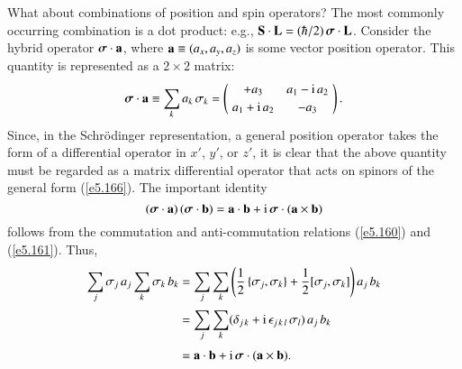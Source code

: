 What about combinations of position and spin operators? The most
commonly occurring combination  is a dot product: {\rm e.g.}, 
${\bf S}\cdot {\bf L} = (\hbar/2)\,\mbox{\boldmath$\sigma$} \cdot {\bf L}$. 
Consider the hybrid
operator  $\mbox{\boldmath$\sigma$} \cdot {\bf a}$, where ${\bf a} \equiv (a_x, a_y, a_z)$ is
some  vector position  operator. This quantity is represented as 
a $2\times 2$ matrix:
\begin{equation}\label{e5.173}
\mbox{\boldmath$\sigma$} \cdot {\bf a} \equiv \sum_k a_k \,\sigma_k = 
\left(\!\begin{array}{cc} +a_3 & a_1 -{\rm i}\,a_2\\[0.5ex]
a_1 + {\rm i}\,a_2 & -a_3 \end{array}\!\right).
\end{equation}
Since, in the Schr\"{o}dinger representation, a general position operator takes
the form of a differential operator in $x'$, $y'$, or $z'$, it is clear that
the above quantity must be regarded as a matrix differential operator that 
acts on spinors of the general form (\ref{e5.166}).
The important identity
\begin{equation}\label{e5.174}
(\mbox{\boldmath$\sigma$} \cdot {\bf a} ) \,(\mbox{\boldmath$\sigma$} \cdot {\bf b}) = {\bf a} \cdot {\bf b}
+{\rm i}\,\mbox{\boldmath$\sigma$}\cdot ({\bf a} \times {\bf b} )
\end{equation}
follows from the commutation and anti-commutation relations (\ref{e5.160}) and (\ref{e5.161}). Thus,
\begin{align}
\sum_j \sigma_j \,a_j \sum_k \sigma_k \,b_k &= \sum_j \sum_k \left(\frac{1}{2}\,
\{\sigma_j, \sigma_k\} + \frac{1}{2} [\sigma_j, \sigma_k]\right) a_j \,b_k\nonumber\\[0.5ex]
&= \sum_j \sum_k (\delta_{j\,k} + {\rm i}\,\epsilon_{j\,k\,l} \,\sigma_l)\,a_j \,b_k\nonumber\\[0.5ex]
&= {\bf a} \cdot {\bf b}
+{\rm i}\,\mbox{\boldmath$\sigma$}\cdot ({\bf a} \times {\bf b} ).
\end{align}

